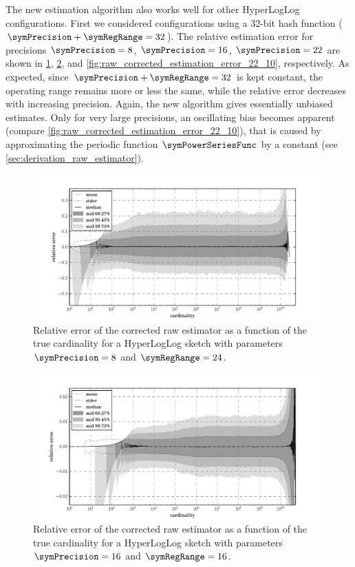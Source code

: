 \documentclass[a4paper]{scrartcl}
\begin{document}
The new estimation algorithm also works well for other HyperLogLog configurations. First we considered configurations using a 32-bit hash function ($\symPrecision + \symRegRange = 32$). The relative estimation error for precisions $\symPrecision=8$, $\symPrecision=16$, $\symPrecision=22$ are shown in \cref{fig:raw_corrected_estimation_error_8_24}, \cref{fig:raw_corrected_estimation_error_16_16}, and \cref{fig:raw_corrected_estimation_error_22_10}, respectively. As expected, since  $\symPrecision + \symRegRange = 32$ is kept constant, the operating range remains more or less the same, while the relative error decreases with increasing precision. Again, the new algorithm gives essentially unbiased estimates. Only for very large precisions, an oscillating bias becomes apparent (compare \cref{fig:raw_corrected_estimation_error_22_10}), that is caused by approximating the periodic function $\symPowerSeriesFunc$ by a constant (see \cref{sec:derivation_raw_estimator}).

\begin{figure}
\centering
\includegraphics[width=1\textwidth]{raw_corrected_estimate_8_24}
\caption{Relative error of the corrected raw estimator as a function of the true cardinality for a HyperLogLog sketch with parameters $\symPrecision = 8$ and $\symRegRange=24$.}
\label{fig:raw_corrected_estimation_error_8_24}
\end{figure}

\begin{figure}
\centering
\includegraphics[width=1\textwidth]{raw_corrected_estimate_16_16}
\caption{Relative error of the corrected raw estimator as a function of the true cardinality for a HyperLogLog sketch with parameters $\symPrecision = 16$ and $\symRegRange=16$.}
\label{fig:raw_corrected_estimation_error_16_16}
\end{figure}
\end{document}
